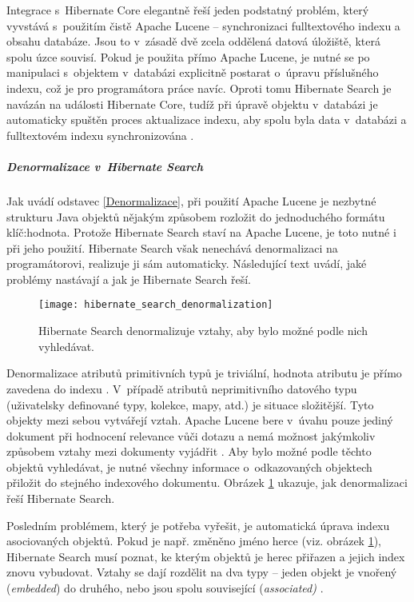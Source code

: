 \documentclass[11pt,oneside]{fithesis2}
\begin{document}
Integrace s~Hibernate Core elegantně řeší jeden podstatný problém, který vyvstává s~použitím čistě Apache Lucene -- synchronizaci fulltextového indexu a obsahu databáze. Jsou to v~zásadě dvě zcela oddělená datová úložiště, která spolu úzce souvisí. Pokud je použita přímo Apache Lucene, je nutné se po manipulaci s~objektem v~databázi explicitně postarat o~úpravu příslušného indexu, což je pro programátora práce navíc. Oproti tomu Hibernate Search je navázán na události Hibernate Core, tudíž při úpravě objektu v~databázi je automaticky spuštěn proces aktualizace indexu, aby spolu byla data v~databázi a fulltextovém indexu synchronizována  \cite[s.~24]{HibernateSearchAction}. 

\subparagraph{Denormalizace v~Hibernate Search} 
\label{HibernateSearchDenormalizace}
Jak uvádí odstavec \ref{Denormalizace}, při použití Apache Lucene je nezbytné strukturu Java objektů nějakým způsobem rozložit do jednoduchého formátu klíč:hodnota. Protože Hibernate Search staví na Apache Lucene, je toto nutné i při jeho použití. Hibernate Search však nenechává denormalizaci na programátorovi, realizuje ji sám automaticky. Následující text uvádí, jaké problémy nastávají a jak je Hibernate Search řeší.

\begin{figure}[h!]
	\begin{center}
		\texttt{[image: hibernate\_search\_denormalization]}
	\end{center}
	\caption{Hibernate Search denormalizuje vztahy, aby bylo možné podle nich vyhledávat.}	
	\label{HibernateSearchDenormalizationExample}
\end{figure}

Denormalizace atributů primitivních typů je triviální, hodnota atributu je přímo zavedena do indexu \cite[str. 76]{HibernateSearchAction}. V~případě atributů neprimitivního datového typu (uživatelsky definované typy, kolekce, mapy, atd.) je situace složitější. Tyto objekty mezi sebou vytvářejí vztah. Apache Lucene bere v~úvahu pouze jediný dokument při hodnocení relevance vůči dotazu a nemá možnost jakýmkoliv způsobem vztahy mezi dokumenty vyjádřit \cite[str. 105]{HibernateSearchAction}. Aby bylo možné podle těchto objektů vyhledávat, je nutné všechny informace o~odkazovaných objektech přiložit do stejného indexového dokumentu. Obrázek \ref{HibernateSearchDenormalizationExample} ukazuje, jak denormalizaci řeší Hibernate Search.

Posledním problémem, který je potřeba vyřešit, je automatická úprava indexu asociovaných objektů. Pokud je např. změněno jméno herce (viz. obrázek \ref{HibernateSearchDenormalizationExample}), Hibernate Search musí poznat, ke kterým objektů je herec přiřazen a jejich index znovu vybudovat. Vztahy se dají rozdělit na dva typy -- jeden objekt je vnořený (\emph{embedded}) do druhého, nebo jsou spolu související (\emph{associated)} \cite[str. 107, 110]{HibernateSearchAction}. 
\end{document}
